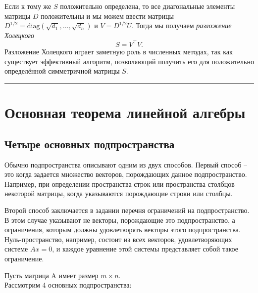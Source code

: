 \documentclass[11pt,a4paper]{article}
\renewcommand{\linethickness}{0.1ex}
\begin{document}
Если к тому же \(S\) положительно определена, то все диагональные
элементы матрицы \(D\) положительны и мы можем ввести матрицы
\(D^{1/2} = \mathrm{diag}\left(\sqrt{d_1}, \dots, \sqrt{d_n}\right)\) и
\(V = D^{1/2}U\). Тогда мы получаем \emph{разложение Холецкого} \[
  S = V^\top V.
\] Разложение Холецкого играет заметную роль в численных методах, так
как существует эффективный алгоритм, позволяющий получить его для
положительно определённой симметричной матрицы \(S\).

    \begin{center}\rule{0.5\linewidth}{\linethickness}\end{center}

    \hypertarget{ux43eux441ux43dux43eux432ux43dux430ux44f-ux442ux435ux43eux440ux435ux43cux430-ux43bux438ux43dux435ux439ux43dux43eux439-ux430ux43bux433ux435ux431ux440ux44b}{%
\section{Основная теорема линейной
алгебры}\label{ux43eux441ux43dux43eux432ux43dux430ux44f-ux442ux435ux43eux440ux435ux43cux430-ux43bux438ux43dux435ux439ux43dux43eux439-ux430ux43bux433ux435ux431ux440ux44b}}

\hypertarget{ux447ux435ux442ux44bux440ux435-ux43eux441ux43dux43eux432ux43dux44bux445-ux43fux43eux434ux43fux440ux43eux441ux442ux440ux430ux43dux441ux442ux432ux430}{%
\subsection{Четыре основных
подпространства}\label{ux447ux435ux442ux44bux440ux435-ux43eux441ux43dux43eux432ux43dux44bux445-ux43fux43eux434ux43fux440ux43eux441ux442ux440ux430ux43dux441ux442ux432ux430}}

Обычно подпространства описывают одним из двух способов. Первый способ
-- это когда задается множество векторов, порождающих данное
подпространство. Например, при определении пространства строк или
пространства столбцов некоторой матрицы, когда указываются порождающие
строки или столбцы.

Второй способ заключается в задании перечня ограничений на
подпространство. В этом случае указывают не векторы, порождающие это
подпространство, а ограничения, которым должны удовлетворять векторы
этого подпространства. Нуль-пространство, например, состоит из всех
векторов, удовлетворяющих системе \(Ax=0\), и каждое уравнение этой
системы представляет собой такое ограничение.

Пусть матрица A имеет размер \(m \times n\).\\
Рассмотрим 4 основных подпространства:
\end{document}

